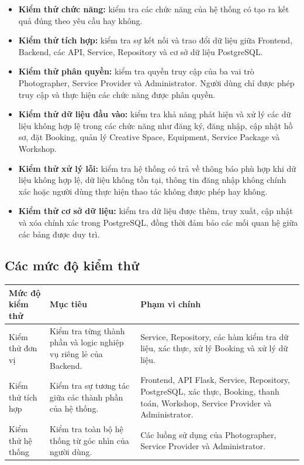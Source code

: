 \begin{itemize}
	\item \textbf{Kiểm thử chức năng:} kiểm tra các chức năng của hệ thống có tạo ra kết quả đúng theo yêu cầu hay không.
	
	\item \textbf{Kiểm thử tích hợp:} kiểm tra sự kết nối và trao đổi dữ liệu giữa Frontend, Backend, các API, Service, Repository và cơ sở dữ liệu PostgreSQL.
	
	\item \textbf{Kiểm thử phân quyền:} kiểm tra quyền truy cập của ba vai trò Photographer, Service Provider và Administrator. Người dùng chỉ được phép truy cập và thực hiện các chức năng được phân quyền.
	
	\item \textbf{Kiểm thử dữ liệu đầu vào:} kiểm tra khả năng phát hiện và xử lý các dữ liệu không hợp lệ trong các chức năng như đăng ký, đăng nhập, cập nhật hồ sơ, đặt Booking, quản lý Creative Space, Equipment, Service Package và Workshop.
	
	\item \textbf{Kiểm thử xử lý lỗi:} kiểm tra hệ thống có trả về thông báo phù hợp khi dữ liệu không hợp lệ, dữ liệu không tồn tại, thông tin đăng nhập không chính xác hoặc người dùng thực hiện thao tác không được phép hay không.
	
	\item \textbf{Kiểm thử cơ sở dữ liệu:} kiểm tra dữ liệu được thêm, truy xuất, cập nhật và xóa chính xác trong PostgreSQL, đồng thời đảm bảo các mối quan hệ giữa các bảng được duy trì.
\end{itemize}

\subsection{Các mức độ kiểm thử}

\begin{longtable}{|>{\raggedright\arraybackslash}p{}|
		>{\raggedright\arraybackslash}p{}|
		>{\raggedright\arraybackslash}p{}|}
	\hline
	\textbf{Mức độ kiểm thử} &
	\textbf{Mục tiêu} &
	\textbf{Phạm vi chính} \\
	\hline
	
	Kiểm thử đơn vị &
	Kiểm tra từng thành phần và logic nghiệp vụ riêng lẻ của Backend. &
	Service, Repository, các hàm kiểm tra dữ liệu, xác thực, xử lý Booking và xử lý dữ liệu. \\
	\hline
	
	Kiểm thử tích hợp &
	Kiểm tra sự tương tác giữa các thành phần của hệ thống. &
	Frontend, API Flask, Service, Repository, PostgreSQL, xác thực, Booking, thanh toán, Workshop, Service Provider và Administrator. \\
	\hline
	
	Kiểm thử hệ thống &
	Kiểm tra toàn bộ hệ thống từ góc nhìn của người dùng. &
	Các luồng sử dụng của Photographer, Service Provider và Administrator. \\
	\hline
	
\end{longtable}

